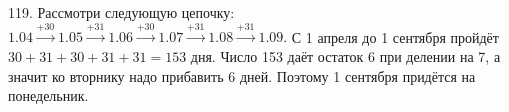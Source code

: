 119. Рассмотри следующую цепочку: $1.04\stackrel{+30}{\rightarrow}1.05\stackrel{+31}{\rightarrow}1.06\stackrel{+30}{\rightarrow}1.07\stackrel{+31}{\rightarrow}1.08\stackrel{+31}{\rightarrow}1.09.$
С 1 апреля до 1 сентября пройдёт $30+31+30+31+31=153$ дня. Число 153 даёт остаток 6 при делении на 7, а значит ко вторнику надо прибавить 6 дней. Поэтому 1 сентября придётся на понедельник.\\
